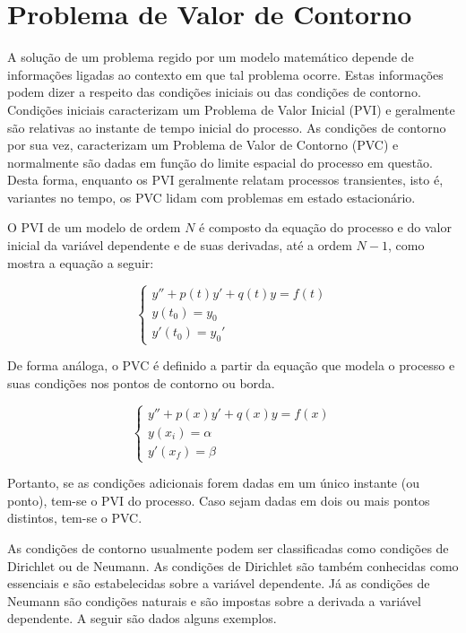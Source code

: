 \section{Problema de Valor de Contorno}


A solução de um problema regido por um modelo matemático depende de informações ligadas ao contexto em que tal problema ocorre.
Estas informações podem dizer a respeito das condições iniciais ou das condições de contorno. 
Condições iniciais caracterizam um Problema de Valor Inicial (PVI) e geralmente são relativas ao instante de tempo inicial do processo.
As condições de contorno por sua vez, caracterizam um Problema de Valor de Contorno (PVC) e  normalmente são dadas em função do limite espacial do processo em questão.
\citep[p. 447]{boyce_diprima}
Desta forma, enquanto os PVI geralmente relatam processos transientes, isto é, variantes no tempo, os PVC lidam com problemas em estado estacionário.

O PVI de um modelo de ordem $N$ é composto da equação do processo e do valor inicial da variável dependente e de suas derivadas, até a ordem $N-1$, como mostra a equação a seguir:

\begin{equation}
	\begin{cases}
		y'' + p(t)y' + q(t)y = f(t) \\
		y(t_0) = y_0 \\
		y'(t_0) = y_0'
	\end{cases}
\end{equation}

De forma análoga, o PVC é definido a partir da equação que modela o processo e suas condições nos pontos de contorno ou borda.

\begin{equation}
	\begin{cases}
		y'' + p(x)y' + q(x)y = f(x) \\
		y(x_i) = \alpha \\
		y'(x_f) = \beta
	\end{cases}
\end{equation}

Portanto, se as condições adicionais forem dadas em um único instante (ou ponto), tem-se o PVI do processo. Caso sejam dadas em dois ou mais pontos distintos, tem-se o PVC.

As condições de contorno usualmente podem ser classificadas como condições de Dirichlet ou de Neumann. 
As condições de Dirichlet são também conhecidas como essenciais e são estabelecidas sobre a variável dependente. Já as condições de Neumann são condições naturais e são impostas sobre a derivada a variável dependente. A seguir são dados alguns exemplos.

